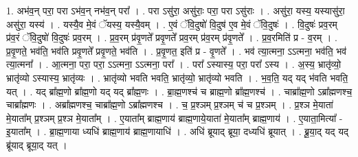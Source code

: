 \documentclass[17pt]{extarticle}
\begin{document}
1. अभ॑व॒न् परा॒ परा ऽभ॑व॒न् नभ॑व॒न् परा᳚ । . परा ऽसु॑रा॒ असु॑राः॒ परा॒ परा ऽसु॑राः । . असु॑रा॒ यस्य॒ यस्यासु॑रा॒ असु॑रा॒ यस्य॑ । . यस्यै॒व मे॒वं ॅयस्य॒ यस्यै॒वम् । . ए॒वं ॅवि॒दुषो॑ वि॒दुष॑ ए॒व मे॒वं ॅवि॒दुषः॑ । . वि॒दुषः॑ प्रव॒रम् प्र॑व॒रं ॅवि॒दुषो॑ वि॒दुषः॑ प्रव॒रम् । . प्र॒व॒रम् प्र॑वृ॒णते᳚ प्रवृ॒णते᳚ प्रव॒रम् प्र॑व॒रम् प्र॑वृ॒णते᳚ । . प्र॒व॒रमिति॑ प्र - व॒रम् । . प्र॒वृ॒णते॒ भव॑ति॒ भव॑ति प्रवृ॒णते᳚ प्रवृ॒णते॒ भव॑ति । . प्र॒वृ॒णत॒ इति॑ प्र - वृ॒णते᳚ । . भव॑ त्या॒त्मना॒ ऽऽत्मना॒ भव॑ति॒ भव॑ त्या॒त्मना᳚ । . आ॒त्मना॒ परा॒ परा॒ ऽऽत्मना॒ ऽऽत्मना॒ परा᳚ । . परा᳚ ऽस्यास्य॒ परा॒ परा᳚ ऽस्य । . अ॒स्य॒ भ्रातृ॑व्यो॒ भ्रातृ॑व्यो ऽस्यास्य॒ भ्रातृ॑व्यः । . भ्रातृ॑व्यो भवति भवति॒ भ्रातृ॑व्यो॒ भ्रातृ॑व्यो भवति । . भ॒व॒ति॒ यद् यद् भ॑वति भवति॒ यत् । . यद् ब्रा᳚ह्म॒णो ब्रा᳚ह्म॒णो यद् यद् ब्रा᳚ह्म॒णः । . ब्रा॒ह्म॒णश्च॑ च ब्राह्म॒णो ब्रा᳚ह्म॒णश्च॑ । . चाब्रा᳚ह्म॒णो ऽब्रा᳚ह्मणश्च॒ चाब्रा᳚ह्मणः । . अब्रा᳚ह्मणश्च॒ चाब्रा᳚ह्म॒णो ऽब्रा᳚ह्मणश्च । . च॒ प्र॒श्ञम् प्र॒श्ञम् च॑ च प्र॒श्ञम् । . प्र॒श्ञ मे॒याता॑ मे॒याता᳚म् प्र॒श्ञम् प्र॒श्ञ मे॒याता᳚म् । . ए॒याता᳚म् ब्राह्म॒णाय॑ ब्राह्म॒णाये॒याता॑ मे॒याता᳚म् ब्राह्म॒णाय॑ । . ए॒याता॒मित्या᳚ - इ॒याता᳚म् । . ब्रा॒ह्म॒णाया ध्यधि॑ ब्राह्म॒णाय॑ ब्राह्म॒णायाधि॑ । . अधि॑ ब्रूयाद् ब्रूया॒ दध्यधि॑ ब्रूयात् । . ब्रू॒या॒द् यद् यद् ब्रू॑याद् ब्रूया॒द् यत् । \newline
\end{document}
